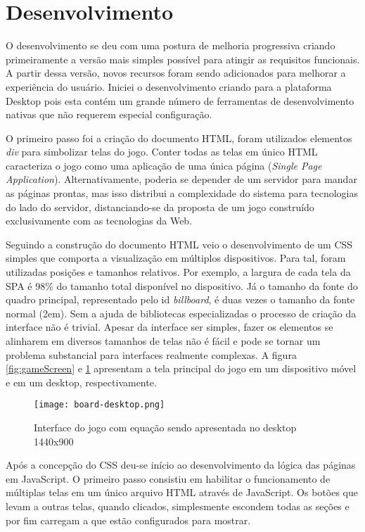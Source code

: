 \section{Desenvolvimento}

O desenvolvimento se deu com uma postura de melhoria progressiva
criando primeiramente  a versão mais simples possível para atingir as
requisitos funcionais. A partir dessa versão, novos recursos foram
sendo adicionados para melhorar a experiência do usuário. Iniciei o
desenvolvimento criando para a plataforma Desktop pois esta contém
um grande número de ferramentas de desenvolvimento nativas que não
requerem especial configuração.

O primeiro passo foi a criação do documento HTML, foram utilizados
elementos \textit{div} para simbolizar telas do jogo. Conter todas as
telas em único HTML caracteriza o jogo como uma aplicação de uma
única página (\textit{Single Page Application}). Alternativamente,
poderia se depender de um servidor para mandar as páginas prontas,
mas isso distribui a complexidade do sistema para tecnologias do
lado do servidor, distanciando-se da proposta de um jogo construído
exclusivamente com as tecnologias da Web.

Seguindo a construção do documento HTML veio o desenvolvimento de um
CSS simples que comporta a visualização em múltiplos dispositivos.
Para tal, foram utilizadas posições e tamanhos relativos. Por exemplo,
a largura de cada tela da SPA é 98\% do tamanho total disponível no
dispositivo. Já o tamanho da fonte do quadro principal, representado
pelo id \textit{billboard}, é duas vezes o tamanho da fonte normal (2em).
Sem a ajuda de bibliotecas especializadas o processo de criação da
interface não é trivial. Apesar da interface ser simples, fazer os elementos
se alinharem em diversos tamanhos de telas não é fácil e pode se
tornar um problema substancial para interfaces realmente complexas.
A figura \ref{fig:gameScreen} e \ref{fig:gameScreenDesktop} apresentam
a tela principal do jogo em um dispositivo móvel e em um desktop, respectivamente.

\begin{figure}[H]
    \centering
    \texttt{[image: board-desktop.png]}
	\caption{Interface do jogo com equação sendo apresentada no desktop 1440x900}
    \label{fig:gameScreenDesktop}
\end{figure}

Após a concepção do CSS deu-se início ao desenvolvimento da lógica
das páginas em JavaScript. O primeiro passo consistiu em habilitar o
funcionamento de múltiplas telas em um único arquivo HTML através
de JavaScript. Os botões que levam a outras telas, quando clicados,
simplesmente escondem todas as seções e por fim carregam a que estão
configurados para mostrar.

